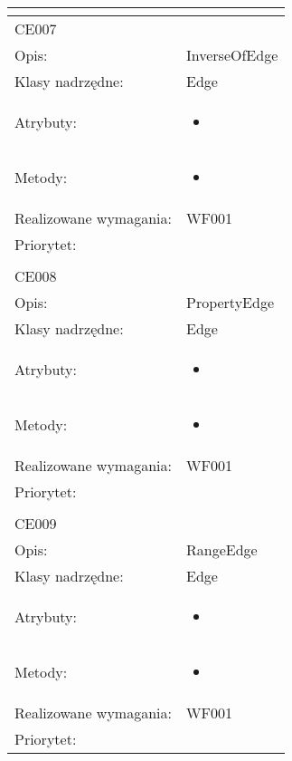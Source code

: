 \documentclass[a4paper,10pt]{article}
\begin{document}
\begin{center}
\begin{longtable}{|m{3cm}|m{9cm}|}
\multicolumn{2}{c}{} \\
 \hline

CE007 &  \\ \hline
Opis: & InverseOfEdge    \\ \hline
Klasy nadrzędne: & Edge    \\ \hline
Atrybuty: & \begin{itemize}
 \item 
\end{itemize}
 \\ \hline
Metody: & \begin{itemize}
 \item 
\end{itemize}
  \\ \hline
Realizowane wymagania: & WF001 \\ \hline
Priorytet: &  \\ \hline

\multicolumn{2}{c}{} \\
 \hline

CE008 &  \\ \hline
Opis: & PropertyEdge    \\ \hline
Klasy nadrzędne: & Edge    \\ \hline
Atrybuty: & \begin{itemize}
 \item 
\end{itemize}
 \\ \hline
Metody: & \begin{itemize}
 \item 
\end{itemize}
  \\ \hline
Realizowane wymagania: & WF001 \\ \hline
Priorytet: &  \\ \hline

\multicolumn{2}{c}{} \\
 \hline

CE009 &  \\ \hline
Opis: & RangeEdge    \\ \hline
Klasy nadrzędne: & Edge    \\ \hline
Atrybuty: & \begin{itemize}
 \item 
\end{itemize}
 \\ \hline
Metody: & \begin{itemize}
 \item 
\end{itemize}
  \\ \hline
Realizowane wymagania: & WF001 \\ \hline
Priorytet: &  \\ \hline


\end{longtable}
\end{center}
\end{document}
